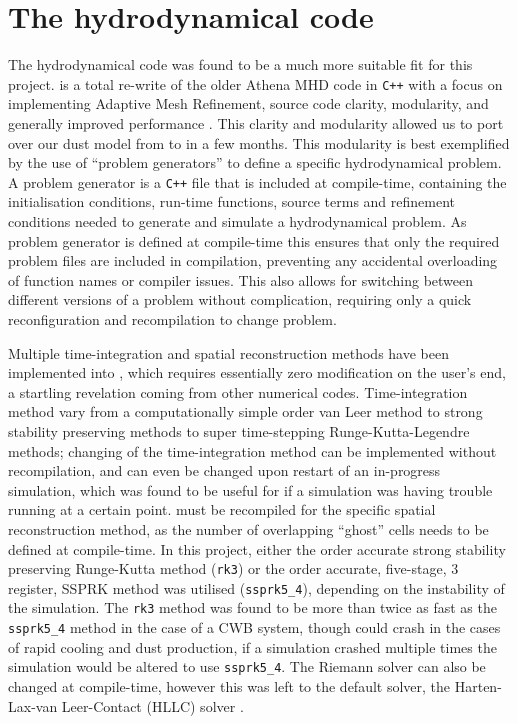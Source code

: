\section{The \athena{} hydrodynamical code}
\label{sec:athenapp}

The  hydrodynamical code was found to be a much more suitable fit for this project.
\athena{} is a total re-write of the older Athena MHD code in \texttt{C++} with a focus on implementing Adaptive Mesh Refinement, source code clarity, modularity, and generally improved performance \parencite{stoneAthenaAdaptiveMesh2020}. 
This clarity and modularity allowed us to port over our dust model from \mg{} to \athena{} in a few months.
This modularity is best exemplified by the use of ``problem generators'' to define a specific hydrodynamical problem.
A problem generator is a \texttt{C++} file that is included at compile-time, containing the initialisation conditions, run-time functions, source terms and refinement conditions needed to generate and simulate a hydrodynamical problem.
As problem generator is defined at compile-time this ensures that only the required problem files are included in compilation, preventing any accidental overloading of function names or compiler issues.
This also allows for switching between different versions of a problem without complication, requiring only a quick reconfiguration and recompilation to change problem. 

Multiple time-integration and spatial reconstruction methods have been implemented into \athena{}, which requires essentially zero modification on the user's end, a startling revelation coming from other numerical codes.
Time-integration method vary from a computationally simple  order van Leer \parencite{vanleerUltimateConservativeDifference1979} method to strong stability preserving methods \parencite{ruuthHighOrderStrongStabilityPreservingRungeKutta2005} to super time-stepping Runge-Kutta-Legendre \parencite{meyerStabilizedRungeKuttaLegendreMethod2014} methods;
changing of the time-integration method can be implemented without recompilation, and can even be changed upon restart of an in-progress simulation, which was found to be useful for if a simulation was having trouble running at a certain point.
\athena{} must be recompiled for the specific spatial reconstruction method, as the number of overlapping ``ghost'' cells needs to be defined at compile-time. 
In this project, either the  order accurate strong stability preserving Runge-Kutta method (\texttt{rk3}) or the  order accurate, five-stage, 3 register, SSPRK method was utilised (\texttt{ssprk5\_4}), depending on the instability of the simulation.
The \texttt{rk3} method was found to be more than twice as fast as the \texttt{ssprk5\_4} method in the case of a CWB system, though could crash in the cases of rapid cooling and dust production, if a simulation crashed multiple times the simulation would be altered to use \texttt{ssprk5\_4}. 
The Riemann solver can also be changed at compile-time, however this was left to the default solver, the Harten-Lax-van Leer-Contact (HLLC) solver \parencite{toroRestorationContactSurface1994}.

